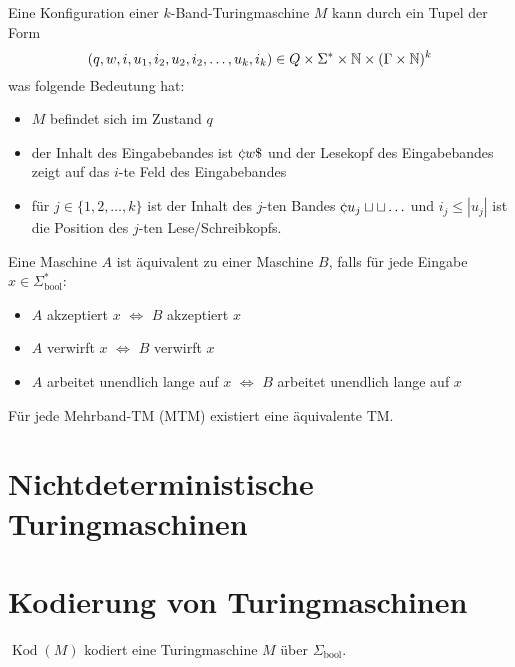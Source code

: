 Eine Konfiguration einer \(k\)-Band-Turingmaschine \(M\) kann durch ein Tupel der Form
\[
(q, w, i, u_1, i_2, u_2, i_2, \ldots, u_k, i_k) \in Q \times \Sigma^* \times \mathbb{N} \times (\Gamma \times \mathbb{N})^k
\]
was folgende Bedeutung hat:
\begin{itemize}
  \item \(M\) befindet sich im Zustand \(q\)
  \item der Inhalt des Eingabebandes ist \(\stopsym w \$ \) und der Lesekopf des Eingabebandes zeigt auf das \(i\)-te Feld des Eingabebandes
  \item für \(j \in \{1, 2, \ldots, k\}\) ist der Inhalt des \(j\)-ten Bandes \(\stopsym u_j \emptysym \emptysym \ldots\) und \(i_j \leq |u_j|\) ist die Position des \(j\)-ten Lese/Schreibkopfs.\\
\end{itemize}

\begin{definition}
Eine Maschine \(A\) ist äquivalent zu einer Maschine \(B\), falls für jede Eingabe \(x \in \Sigma_\text{bool}^*\):
\begin{itemize}
  \item \(A\) akzeptiert \(x\) \(\Leftrightarrow\) \(B\) akzeptiert \(x\)
  \item \(A\) verwirft \(x\) \(\Leftrightarrow\) \(B\) verwirft \(x\)
  \item \(A\) arbeitet unendlich lange auf \(x\) \(\Leftrightarrow\) \(B\) arbeitet unendlich lange auf \(x\)\\
\end{itemize}

\end{definition}

\begin{lemma}
Für jede Mehrband-TM (MTM) existiert eine äquivalente TM.
\end{lemma}

\section{Nichtdeterministische Turingmaschinen}

\section{Kodierung von Turingmaschinen}
\begin{definition}
\(\operatorname{Kod}(M)\) kodiert eine Turingmaschine \(M\) über \(\Sigma_\text{bool}\).\\
\end{definition}

